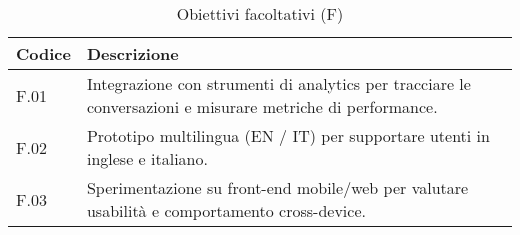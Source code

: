  \begin{table}[H]
    \centering
    \caption{Obiettivi facoltativi (F)}
    \begin{tabularx}{\textwidth}{|p{}|>{\raggedright\arraybackslash}X|}
      \hline
      \textbf{Codice} & \textbf{Descrizione} \\
      \hline
      F.01 & Integrazione con strumenti di analytics per tracciare le conversazioni e misurare metriche di performance. \\
      \hline
      F.02 & Prototipo multilingua (EN / IT) per supportare utenti in inglese e italiano. \\
      \hline
      F.03 & Sperimentazione su front-end mobile/web per valutare usabilità e comportamento cross-device. \\
      \hline
    \end{tabularx}
  \end{table}

